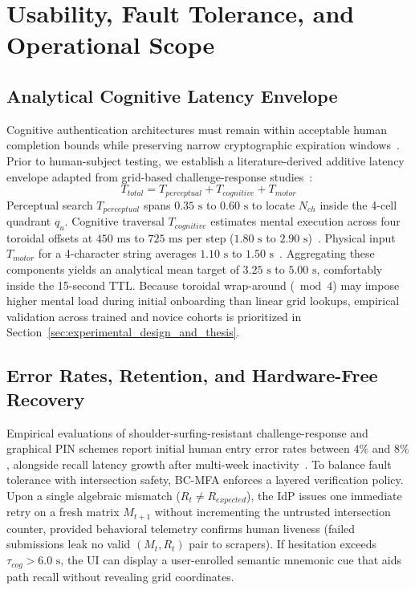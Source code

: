 \section{Usability, Fault Tolerance, and Operational Scope}
\label{sec:usability_and_overhead}

\subsection{Analytical Cognitive Latency Envelope}
Cognitive authentication architectures must remain within acceptable human completion bounds while preserving narrow cryptographic expiration windows~\cite{kepkowski2023challenges, binbeshr2025challenge}. Prior to human-subject testing, we establish a literature-derived additive latency envelope adapted from grid-based challenge-response studies~\cite{binbeshr2025challenge, duzgun2022shoulder}:
\begin{equation}
T_{total} = T_{perceptual} + T_{cognitive} + T_{motor}
\label{eq:latency}
\end{equation}
Perceptual search $T_{perceptual}$ spans $0.35\text{ s}$ to $0.60\text{ s}$ to locate $N_{ch}$ inside the 4-cell quadrant $q_u$. Cognitive traversal $T_{cognitive}$ estimates mental execution across four toroidal offsets at $450\text{ ms}$ to $725\text{ ms}$ per step ($1.80\text{ s}$ to $2.90\text{ s}$)~\cite{binbeshr2025challenge}. Physical input $T_{motor}$ for a 4-character string averages $1.10\text{ s}$ to $1.50\text{ s}$~\cite{incel2021dakota, khan2024mouse}. Aggregating these components yields an analytical mean target of $3.25\text{ s}$ to $5.00\text{ s}$, comfortably inside the 15-second TTL. Because toroidal wrap-around ($\bmod 4$) may impose higher mental load during initial onboarding than linear grid lookups, empirical validation across trained and novice cohorts is prioritized in Section~\ref{sec:experimental_design_and_thesis}.

\subsection{Error Rates, Retention, and Hardware-Free Recovery}
Empirical evaluations of shoulder-surfing-resistant challenge-response and graphical PIN schemes report initial human entry error rates between $4\%$ and $8\%$, alongside recall latency growth after multi-week inactivity~\cite{binbeshr2025challenge, duzgun2022shoulder}. To balance fault tolerance with intersection safety, BC-MFA enforces a layered verification policy. Upon a single algebraic mismatch ($R_t \ne R_{expected}$), the IdP issues one immediate retry on a fresh matrix $M_{t+1}$ without incrementing the untrusted intersection counter, provided behavioral telemetry confirms human liveness (failed submissions leak no valid $(M_t, R_t)$ pair to scrapers). If hesitation exceeds $\tau_{cog} > 6.0\text{ s}$, the UI can display a user-enrolled semantic mnemonic cue that aids path recall without revealing grid coordinates.

